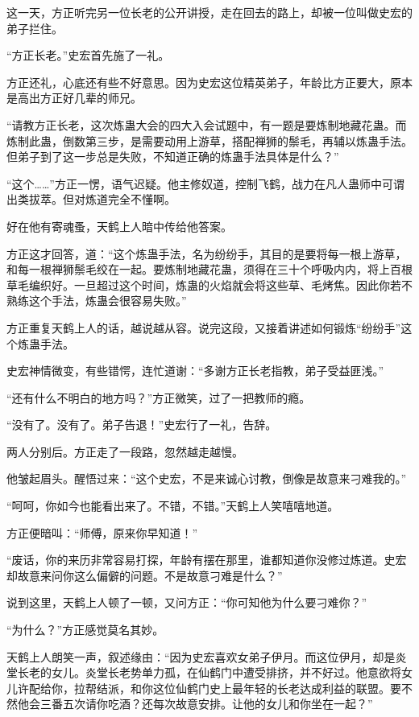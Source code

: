 
\begin{this_body}



这一天，方正听完另一位长老的公开讲授，走在回去的路上，却被一位叫做史宏的弟子拦住。

“方正长老。”史宏首先施了一礼。

方正还礼，心底还有些不好意思。因为史宏这位精英弟子，年龄比方正要大，原本是高出方正好几辈的师兄。

“请教方正长老，这次炼蛊大会的四大入会试题中，有一题是要炼制地藏花蛊。而炼制此蛊，倒数第三步，是需要动用上游草，搭配禅狮的鬃毛，再辅以炼蛊手法。但弟子到了这一步总是失败，不知道正确的炼蛊手法具体是什么？”

“这个……”方正一愣，语气迟疑。他主修奴道，控制飞鹤，战力在凡人蛊师中可谓出类拔萃。但对炼道完全不懂啊。

好在他有寄魂蚤，天鹤上人暗中传给他答案。

方正这才回答，道：“这个炼蛊手法，名为纷纷手，其目的是要将每一根上游草，和每一根禅狮鬃毛绞在一起。要炼制地藏花蛊，须得在三十个呼吸内内，将上百根草毛编织好。一旦超过这个时间，炼蛊的火焰就会将这些草、毛烤焦。因此你若不熟练这个手法，炼蛊会很容易失败。”

方正重复天鹤上人的话，越说越从容。说完这段，又接着讲述如何锻炼“纷纷手”这个炼蛊手法。

史宏神情微变，有些错愕，连忙道谢：“多谢方正长老指教，弟子受益匪浅。”

“还有什么不明白的地方吗？”方正微笑，过了一把教师的瘾。

“没有了。没有了。弟子告退！”史宏行了一礼，告辞。

两人分别后。方正走了一段路，忽然越走越慢。

他皱起眉头。醒悟过来：“这个史宏，不是来诚心讨教，倒像是故意来刁难我的。”

“呵呵，你如今也能看出来了。不错，不错。”天鹤上人笑嘻嘻地道。

方正便暗叫：“师傅，原来你早知道！”

“废话，你的来历非常容易打探，年龄有摆在那里，谁都知道你没修过炼道。史宏却故意来问你这么偏僻的问题。不是故意刁难是什么？”

说到这里，天鹤上人顿了一顿，又问方正：“你可知他为什么要刁难你？”

“为什么？”方正感觉莫名其妙。

天鹤上人朗笑一声，叙述缘由：“因为史宏喜欢女弟子伊月。而这位伊月，却是炎堂长老的女儿。炎堂长老势单力孤，在仙鹤门中遭受排挤，并不好过。他意欲将女儿许配给你，拉帮结派，和你这位仙鹤门史上最年轻的长老达成利益的联盟。要不然他会三番五次请你吃酒？还每次故意安排。让他的女儿和你坐在一起？”


\end{this_body}
